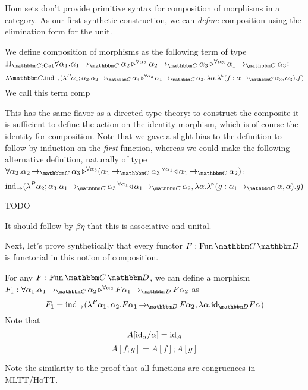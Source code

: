 \documentclass{llncs}
\begin{document}
Hom sets don't provide primitive syntax for composition of morphisms
in a category. As our first synthetic construction, we can
\emph{define} composition using the elimination form for the unit.
%
\begin{definition}
  We define composition of morphisms as the following term of type $\Pi_{\cat C:\Cat}\hombinary {\alpha_1} {\punitinXfromYtoZ {\cat C}{\alpha_1} {\alpha_2}} {\alpha_2} {\punitinXfromYtoZ {\cat C}{\alpha_2} {\alpha_3}} {\alpha_3} {\punitinXfromYtoZ {\cat C}{\alpha_1} {\alpha_3}}$:
  \[
  \lambda \cat C. \punitelimtoYwithkontZ {\hlambda {\alpha_1}{\alpha_2} \homrallXYtoZ {\alpha_3} {\punitinXfromYtoZ {\cat C} {\alpha_2} {\alpha_3}} {\punitinXfromYtoZ {\cat C} {\alpha_1} {\alpha_3}}} {\lambdaunary {\alpha} {f : \punitinXfromYtoZ {\cat C}{\alpha} {\alpha_3}} {\alpha_3} f}
  \]
  We call this term $\textrm{comp}$
\end{definition}
This has the same flavor as a directed type theory: to construct the
composite it is sufficient to define the action on the identity
morphism, which is of course the identity for composition.
%
Note that we gave a slight bias to the definition to follow by
induction on the \emph{first} function, whereas we could make the
following alternative definition, naturally of type
$\pendallXdotY {\alpha_2} \homrallXYtoZ {\alpha_3} {\punitinXfromYtoZ {\cat C}{\alpha_2} {\alpha_3}}
{(\homlallXYtoZ {{\alpha_1}} {\punitinXfromYtoZ {\cat C}{\alpha_1} {\alpha_2}}{\punitinXfromYtoZ {\cat C}{\alpha_1} {\alpha_3}})}$:
\[
  \punitelimtoYwithkontZ {\hlambda {\alpha_2}{\alpha_3} \homlallXYtoZ {{\alpha_1}} {\punitinXfromYtoZ {\cat C}{\alpha_1} {\alpha_2}}{\punitinXfromYtoZ {\cat C}{\alpha_1} {\alpha_3}} } {\lambdaunary {\alpha} {g : \punitinXfromYtoZ {\cat C}{\alpha_1}{\alpha}} {\alpha} g}
\]

\begin{lemma}
  TODO
\end{lemma}

It should follow by $\beta\eta$ that this is associative and unital.

Next, let's prove synthetically that every functor $F : \varr{\cat
  C}{\cat D}$ is functorial in this notion of composition.
\begin{definition}
  For any $F : \varr {\cat C} {\cat D}$, we can define a morphism $F_1
  : \homunary {\alpha_1} {\punitinXfromYtoZ {\cat C} {\alpha_1}
    {\alpha_2}} {\alpha_2} {\punitinXfromYtoZ {\cat D} {F \alpha_1}
    {F \alpha_2}}$ as
  \[ F_1 = \punitelimtoYwithkontZ {\hlambda {\alpha_1}{\alpha_2} \punitinXfromYtoZ {\cat D} {F \alpha_1}{F \alpha_2}}
  {\pendlambdaXdotY \alpha \punitrefl {\cat D} {F \alpha}}
  \]
  Note that
  \[ A[\textrm{id}_\alpha/\alpha] = \textrm{id}_{A} \]
  \[ A[f;g] = A[f];A[g] \]
\end{definition}
Note the similarity to the proof that all functions are congruences in
MLTT/HoTT.
\end{document}
